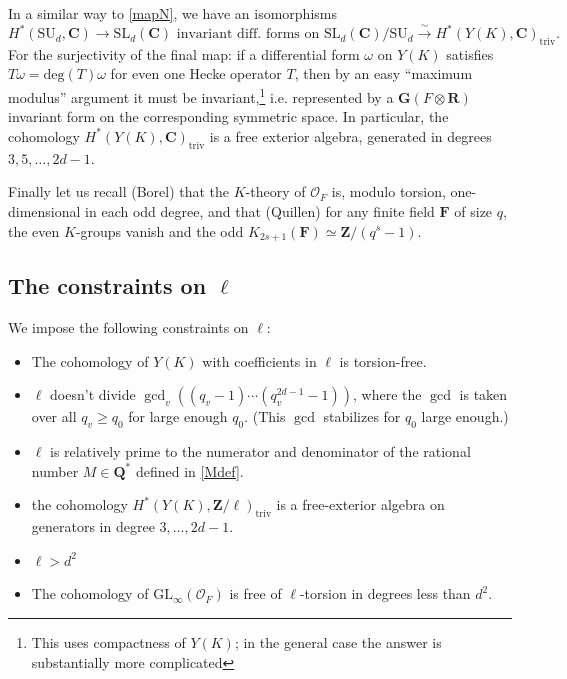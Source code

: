 \documentclass[10pt]{amsart}
\newcommand{\Z}{\mathbf{Z}}
\newcommand{\triv}{\mathrm{triv}}
\newcommand{\SL}{\mathrm{SL}}
\newcommand{\C}{\mathbf{C}}
\newcommand{\OO}{\mathcal{O}}
\newcommand{\R}{\mathbf{R}}
\newcommand{\GL}{\mathrm{GL}}
\theoremstyle{remark}
\newcommand{\GG}{\mathbf{G}}
\begin{document}
In a similar way to \eqref{mapN}, we have  an  isomorphisms
\begin{equation} \label{raru} H^*(\mathrm{SU}_d, \C) \rightarrow  \mbox{$\SL_d(\C)$ invariant diff. forms on $\mathrm{SL}_d(\C)/\mathrm{SU}_d$}  \stackrel{\sim}{\rightarrow} H^*(Y(K), \C)_{\triv}. \end{equation}
For the surjectivity of the final map:  if a differential form
$\omega$  on $Y(K)$ satisfies $T \omega = \mathrm{deg}(T) \omega$ for even one Hecke operator $T$,
then by an easy ``maximum modulus'' argument it must be invariant,\footnote{This uses compactness of $Y(K)$; in the general case the answer is substantially more complicated} i.e. represented by a $\GG(F \otimes\R)$ invariant form on the corresponding symmetric space. In particular, the cohomology $H^*(Y(K), \C)_{\triv}$
is a free exterior algebra, generated in degrees $3,5, \dots, 2d-1$. 
 


 
 
 Finally let us recall  (Borel) that the $K$-theory of $\OO_F$ is, modulo torsion, one-dimensional in each odd degree,
 and that (Quillen) for  any finite field $\mathbf{F}$ of size $q$, 
 the even $K$-groups vanish and the odd $K_{2s+1}(\mathbf{F}) \simeq \Z/(q^s-1)$. 
 
 
 
%
%
%
%
%



\subsection{The constraints on $\ell$} \label{lconstrain}

We impose the following constraints on $\ell$: 
\begin{itemize}
\item[(i)] The cohomology of $Y(K)$ with coefficients in $\ell$ is torsion-free.
\item[(ii)]  $\ell$ doesn't divide $  \gcd_{v} ( (q_v-1) \cdots (q_v^{2d-1}-1))$,
where the $\gcd$ is taken over all  $q_v \geq q_0$ for large enough $q_0$. (This $\gcd$ stabilizes for $q_0$ large enough.)
\item[(iii)]  $\ell$ is relatively prime to the numerator and denominator of the rational number  $M \in \mathbf{Q}^*$ 
 defined in \eqref{Mdef}.
 \item[(iv)]  the cohomology $H^*(Y(K), \Z/\ell)_{\triv}$ is a free-exterior algebra
on generators in degree $3,\dots, 2d-1$.
\item[(v)] $\ell > d^2$ 
\item[(vi)] The cohomology of $\GL_{\infty}(\mathcal{O}_F)$ is  free of $\ell$-torsion in degrees less than $d^2$. 
\end{itemize}
\end{document}
